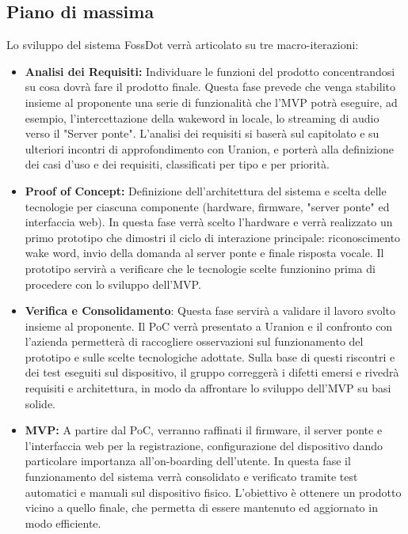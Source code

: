 \documentclass[12pt,a4paper]{article}
\newcommand{\tightlist}{\setlength{\itemsep}{1pt}\setlength{\parskip}{0pt}}
\begin{document}
\hypertarget{piano-di-massima}{%
\subsection{Piano di massima}}
Lo sviluppo del sistema FossDot verrà articolato su tre macro-iterazioni:
\begin{itemize}
\tightlist
\item \textbf{Analisi dei Requisiti:} Individuare le funzioni del prodotto concentrandosi su cosa dovrà fare il prodotto finale. Questa fase prevede che venga stabilito insieme al proponente una serie di funzionalità che l'MVP potrà eseguire, ad esempio, l'intercettazione della wakeword in locale, lo streaming di audio verso il "Server ponte". L’analisi dei requisiti si baserà sul capitolato e su ulteriori incontri di approfondimento con Uranion, e porterà alla definizione dei casi d’uso e dei requisiti, classificati per tipo e per priorità. 
\item \textbf{Proof of Concept:} Definizione dell'architettura del sistema e scelta delle tecnologie per ciascuna componente (hardware, firmware, "server ponte" ed interfaccia web). In questa fase verrà scelto l'hardware e verrà realizzato un primo prototipo che dimostri il ciclo di interazione principale: riconoscimento wake word, invio della domanda al server ponte e finale risposta vocale. Il prototipo servirà a verificare che le tecnologie scelte funzionino prima di procedere con lo sviluppo dell'MVP.
\item \textbf{Verifica e Consolidamento}: Questa fase servirà a validare il lavoro svolto insieme al proponente. Il PoC verrà presentato a Uranion e il confronto con l'azienda permetterà di raccogliere osservazioni sul funzionamento del prototipo e sulle scelte tecnologiche adottate. Sulla base di questi riscontri e dei test eseguiti sul dispositivo, il gruppo correggerà i difetti emersi e rivedrà requisiti e architettura, in modo da affrontare lo sviluppo dell'MVP su basi solide.
\item \textbf{MVP:} A partire dal PoC, verranno raffinati il firmware, il server ponte e l'interfaccia web per la registrazione, configurazione del dispositivo dando particolare importanza all'on-boarding dell'utente. In questa fase il funzionamento del sistema verrà consolidato e verificato tramite test automatici e manuali sul dispositivo fisico. L'obiettivo è ottenere un prodotto vicino a quello finale, che permetta di essere mantenuto ed aggiornato in modo efficiente.
\end{itemize}
\end{document}
